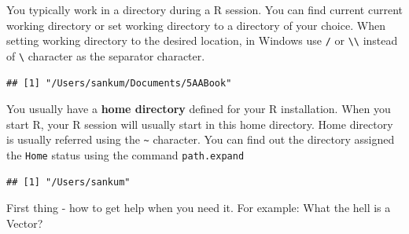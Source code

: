 \documentclass[10pt, letterpaper, twoside]{memoir}\usepackage{knitr}
\begin{document}
You typically work in a directory during a R session. You can find current current working directory or set working directory to a directory of your choice. 
When setting working directory to the desired location, in Windows use \verb|/| or \verb|\\| instead of \verb|\| character as the separator character. 
\begin{knitrout}
\color{fgcolor}\begin{kframe}
\begin{alltt}
\hlstd{()}
\end{alltt}
\begin{verbatim}
## [1] "/Users/sankum/Documents/5AABook"
\end{verbatim}
\end{kframe}
\end{knitrout}
\begin{knitrout}
\color{fgcolor}\begin{kframe}
\begin{alltt}
\hlstd{(}\hlstd{)}
\end{alltt}
\end{kframe}
\end{knitrout}

You usually have a \textbf{home directory} defined for your R installation. When you start R, your R session will usually start in this home directory. Home directory is usually referred using the \verb|~| character. You can find out the directory assigned the \texttt{Home} status using the command \texttt{path.expand}
\begin{knitrout}
\color{fgcolor}\begin{kframe}
\begin{alltt}
\hlstd{(}\hlstd{)}
\end{alltt}
\begin{verbatim}
## [1] "/Users/sankum"
\end{verbatim}
\end{kframe}
\end{knitrout}

First thing - how to get help when you need it. For example: What the hell is a Vector?
\begin{knitrout}
\color{fgcolor}\begin{kframe}
\begin{alltt}
\hlstd{(}\hlstd{)}  
\hlstd{(}  
\hlstd{)}
\hlstd{(}\hlstd{)}  
\end{alltt}
\end{kframe}
\end{knitrout}
\end{document}
